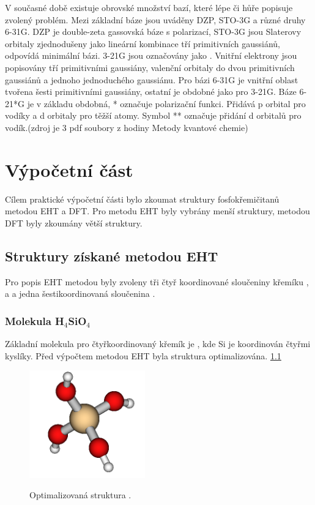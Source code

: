 \documentclass[
  digital, %
  table,   %
  lof,     %
  lot,     %
]{fithesis3}
\begin{document}
 V současné době existuje obrovské množství bazí, které lépe či hůře popisuje zvolený problém. Mezi základní báze jsou uváděny DZP, STO-3G a různé druhy 6-31G. DZP je double-zeta gassovská báze s polarizací, STO-3G jsou Slaterovy orbitaly zjednodušeny jako lineární kombinace tří primitivních gaussiánů, odpovídá minimální bázi. 3-21G jsou označovány jako . Vnitřní elektrony jsou popisovány tří primitivními gaussiány, valenční orbitaly  do dvou primitivních gaussiánů a jednoho jednoduchého gaussiánu. Pro bázi 6-31G je vnitřní oblast tvořena šesti primitivními gaussiány, ostatní je obdobné jako pro 3-21G. Báze 6-21*G je v základu obdobná, * označuje polarizační funkci. Přidává p orbital pro vodíky a d orbitaly pro těžší atomy. Symbol ** označuje přidání d orbitalů pro vodík.(zdroj je 3 pdf soubory z hodiny Metody kvantové chemie) 



\chapter{Výpočetní část}
Cílem praktické výpočetní části bylo zkoumat struktury fosfokřemičitanů metodou EHT a DFT. Pro metodu EHT byly vybrány menší struktury, metodou DFT byly zkoumány větší struktury.
\section{Struktury získané metodou EHT}
Pro popis EHT metodou byly zvoleny tři čtyř koordinované sloučeniny křemíku ,  a  a jedna šestikoordinovaná sloučenina .
\subsection{Molekula H$_4$SiO$_4$}
Základní molekula pro čtyřkoordinovaný křemík je , kde Si je koordinován čtyřmi kyslíky. Před výpočtem metodou EHT byla struktura optimalizována. \ref{obr_h4sio4_opt_struktura}

\begin{figure}[h!]
\caption{Optimalizovaná struktura . }
  \center
  \includegraphics[width=5cm]{h4sio4_obr.png}
  \label{obr_h4sio4_opt_struktura}
  \end{figure}
\end{document}
